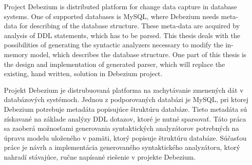  
	\abstractpage
    

	Project Debezium is distributed platform for change data capture in database systems. One of supported databases is MySQL, where Debezium needs meta-data for describing of the database structure. These meta-data are acquired by analysis of DDL statements, which has to be parsed. This thesis deals with the possibilities of generating the syntactic analyzers necessary to modify the in-memory model, which describes the database structure. One part of this thesis is the design and implementation of generated parser, which will replace the existing, hand written, solution in Debezium project.

	\baselineskip

	\noindent
    Projekt Debezium je distrubuovaná platforma na zachytávanie zmenených dát v databázových systémoch. Jednou z podporovaných databázi je MySQL, pri ktorej Debezium potrebuje metadáta popisujúce štruktúru databáze. Tieto metadáta sú získavané na základe analýzy DDL dotazov, ktoré je nutné sparsovať. Táto práca sa zaoberá možnosťami generovania syntaktických analyzátorov potrebných na úpravu modelu uloženého v pamäti, ktorý popisuje štruktúru databáze. Súčasťou práce je návrh a implementácia generovaného syntaktického analyzátoru, ktorý nahradí stávajúce, ručne napísané riešenie v projekte Debezium.
